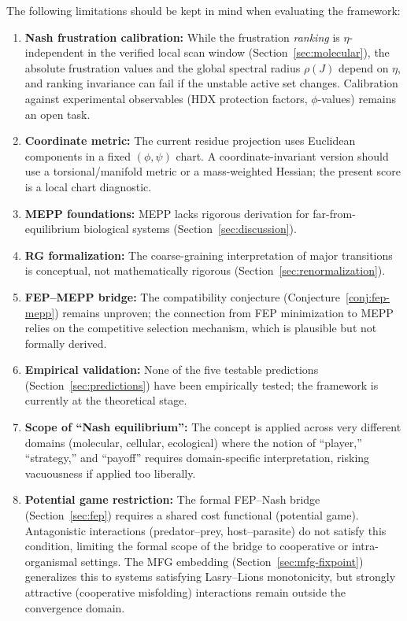 \documentclass[12pt,a4paper]{article}
\theoremstyle{remark}
\begin{document}
The following limitations should be kept in mind when evaluating the framework:
\begin{enumerate}
    \item \textbf{Nash frustration calibration:} While the frustration \emph{ranking} is $\eta$-independent in the verified local scan window (Section~\ref{sec:molecular}), the absolute frustration values and the global spectral radius $\rho(J)$ depend on $\eta$, and ranking invariance can fail if the unstable active set changes. Calibration against experimental observables (HDX protection factors, $\phi$-values) remains an open task.
    \item \textbf{Coordinate metric:} The current residue projection uses Euclidean components in a fixed $(\phi,\psi)$ chart. A coordinate-invariant version should use a torsional/manifold metric or a mass-weighted Hessian; the present score is a local chart diagnostic.
    \item \textbf{MEPP foundations:} MEPP lacks rigorous derivation for far-from-equilibrium biological systems (Section~\ref{sec:discussion}).
    \item \textbf{RG formalization:} The coarse-graining interpretation of major transitions is conceptual, not mathematically rigorous (Section~\ref{sec:renormalization}).
    \item \textbf{FEP--MEPP bridge:} The compatibility conjecture (Conjecture~\ref{conj:fep-mepp}) remains unproven; the connection from FEP minimization to MEPP relies on the competitive selection mechanism, which is plausible but not formally derived.
    \item \textbf{Empirical validation:} None of the five testable predictions (Section~\ref{sec:predictions}) have been empirically tested; the framework is currently at the theoretical stage.
    \item \textbf{Scope of ``Nash equilibrium'':} The concept is applied across very different domains (molecular, cellular, ecological) where the notion of ``player,'' ``strategy,'' and ``payoff'' requires domain-specific interpretation, risking vacuousness if applied too liberally.
    \item \textbf{Potential game restriction:} The formal FEP--Nash bridge (Section~\ref{sec:fep}) requires a shared cost functional (potential game). Antagonistic interactions (predator--prey, host--parasite) do not satisfy this condition, limiting the formal scope of the bridge to cooperative or intra-organismal settings. The MFG embedding (Section~\ref{sec:mfg-fixpoint}) generalizes this to systems satisfying Lasry--Lions monotonicity, but strongly attractive (cooperative misfolding) interactions remain outside the convergence domain.
\end{enumerate}
\end{document}
